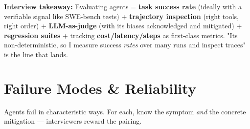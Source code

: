 \documentclass[11pt]{article}
\begin{document}
\textbf{Interview takeaway:} Evaluating agents = \textbf{task success rate} (ideally with a verifiable signal like SWE-bench tests) + \textbf{trajectory inspection} (right tools, right order) + \textbf{LLM-as-judge} (with its biases acknowledged and mitigated) + \textbf{regression suites} + tracking \textbf{cost/latency/steps} as first-class metrics. "It\textquotesingle s non-deterministic, so I measure success \emph{rates} over many runs and inspect traces" is the line that lands.

\section{Failure Modes \& Reliability}\label{failure-modes--reliability}

Agents fail in characteristic ways. For each, know the symptom \emph{and} the concrete mitigation --- interviewers reward the pairing.
\end{document}
